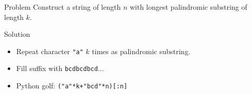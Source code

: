 \begin{frame}{\problemtitle}
	\begin{block}{Problem}
		Construct a string of length $n$ with longest palindromic substring of length $k$.
	\end{block}
	\pause
	\begin{block}{Solution}
		\begin{itemize}
			\item Repeat character \texttt{"a"} $k$ times as palindromic substring.
			\item Fill suffix with \texttt{bcdbcdbcd}...
			\item Python golf: \texttt{("a"*k+"bcd"*n)[:n]}
		\end{itemize}
	\end{block}
\end{frame}




